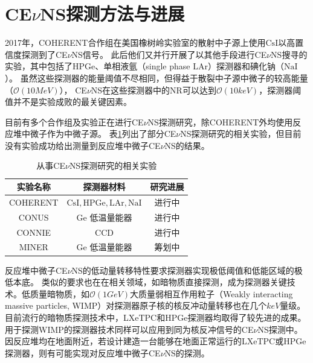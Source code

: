 \section{CE$\nu$NS探测方法与进展}

2017年，COHERENT合作组在美国橡树岭实验室的散射中子源上使用$\mathrm{CsI}$以高置信度探测到了CE$\nu$NS信号\cite{akimov_observation_2017}。
此后他们又并行开展了以其他手段进行CE$\nu$NS搜寻的实验，其中包括了HPGe、单相液氩（single phase LAr）探测器和碘化钠（$\mathrm{NaI}$）。
虽然这些探测器的能量阈值不尽相同，但得益于散裂中子源中微子的较高能量（$\mathcal{O}\left(10\si{MeV}\right)$），
CE$\nu$NS在这些探测器中的NR可以达到$\mathcal{O}\left(10\si{keV}\right)$，探测器阈值并不是实验成败的最关键因素。

目前有多个合作组及实验正在进行CE$\nu$NS探测研究，除COHERENT外均使用反应堆中微子作为中微子源。
表\ref{tab:experiments}列出了部分CE$\nu$NS探测研究的相关实验，但目前没有实验成功给出测量到反应堆中微子CE$\nu$NS的结果。

\begin{table}
  \centering
  \caption{从事CE$\nu$NS探测研究的相关实验}
  \begin{tabular}{c|c|c}
    \toprule
    实验名称 & 探测器材料 & 研究进展 \\
    \midrule
    COHERENT & $\mathrm{CsI,HPGe,LAr,NaI}$ & 进行中\cite{coherent_collaboration_monitoring_2022} \\
    CONUS & $\mathrm{Ge}$ 低温量能器 & 进行中\cite{conus_collaboration_novel_2021} \\
    CONNIE & $\mathrm{CCD}$ & 进行中\cite{connie_collaboration_search_2022} \\
    MINER & $\mathrm{Ge}$ 低温量能器 & 筹划中\cite{agnolet_background_2017} \\
    \bottomrule
  \end{tabular}
  \label{tab:experiments}
\end{table}

反应堆中微子CE$\nu$NS的低动量转移特性要求探测器实现极低阈值和低能区域的极低本底。
类似的要求也在在相关领域，如暗物质直接探测，成为探测器关键技术。低质量暗物质，如$\mathcal{O}\left(1\si{GeV}\right)$大质量弱相互作用粒子（Weakly interacting massive particles, WIMP）对探测器原子核的核反冲动量转移也在几个$\si{keV}$量级。
目前流行的暗物质探测技术中，LXeTPC和HPGe探测器均取得了较先进的成果。用于探测WIMP的探测器技术同样可以应用到同为核反冲信号的CE$\nu$NS探测中。
因反应堆均在地面附近，若设计建造一台能够在地面正常运行的LXeTPC或HPGe探测器，则有可能实现对反应堆中微子CE$\nu$NS的探测。
